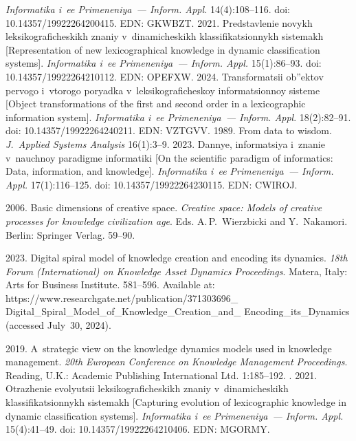 \begin{multicols}{2}
{{\begin{thebibliography}{99}
\textit{Informatika i~ee Primeneniya~--- Inform. \mbox{Appl}.} 14(4):108--116. doi: 
10.14357/19922264200415. EDN: GKWBZT.
 2021. Predstavlenie novykh 
leksikograficheskikh znaniy v~dinamicheskikh klassifikatsionnykh sis\-te\-makh [Representation of new 
lexicographical knowledge in dynamic classification systems]. \textit{Informatika i~ee Primeneniya~--- 
Inform. Appl.} 15(1):86--93. doi: 10.14357/19922264210112. EDN: OPEFXW.
 2024. Transformatsii ob''ektov pervogo i~vtorogo poryadka 
v~leksikograficheskoy informatsionnoy sis\-te\-me [Object transformations of the first and second order 
in a lexicographic information system]. \textit{Informatika i~ee Primeneniya~--- Inform. Appl}. 
18(2):82--91. doi: 10.14357/19922264240211. EDN: VZTGVV.
 1989. From data to wisdom. \textit{J.~Applied Systems Analysis} 16(1):3--9.
 2023. Dannye, informatsiya i~znanie v~na\-uch\-noy paradigme informatiki [On the 
scientific paradigm of informatics: Data, information, and knowledge]. \textit{Informatika i~ee 
Primeneniya~--- Inform. Appl.} 17(1):116--125. doi: 10.14357/19922264230115. EDN: CWIROJ.

 2006. Basic dimensions of creative space. \textit{Creative 
space: Models of creative processes for knowledge civilization age}. Eds. A.\,P.~Wierzbicki and 
Y.~Nakamori. Berlin: Springer Verlag. 59--90.

 2023. Digital spiral model of knowledge creation and encoding its dynamics. 
\textit{18th Forum (International) on Knowledge Asset Dynamics Proceedings}. Matera, Italy: Arts for 
Business Institute. 581--596. Available at: {\sf  
https://www.researchgate.net/publication/371303696\_ Digital\_Spiral\_Model\_of\_Knowledge\_Creation\_and\_ 
Encoding\_its\_Dynamics} (accessed 
July~30, 2024).

 2019. A~strategic view on the knowledge dynamics models used in knowledge 
management. \textit{20th European Conference on Knowledge Management Proceedings}. Reading, 
U.K.: Academic Publishing International Ltd. 1:185--192.
. 2021. 
Otrazhenie evolyutsii leksikograficheskikh znaniy v~dinamicheskikh klassifikatsionnykh sistemakh 
[Capturing evolution of lexicographic knowledge in dynamic classification systems]. \textit{Informatika 
i~ee Primeneniya~--- Inform. Appl.} 15(4):41--49. doi: 10.14357/19922264210406. EDN: MGORMY.

\end{thebibliography}

 }
 }

\end{multicols}

